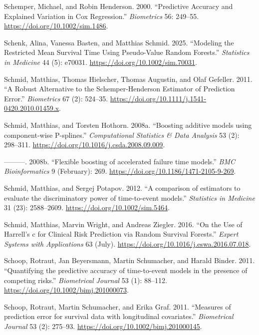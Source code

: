 \documentclass[
  letterpaper,
  krantz2]{style/krantz}
\newlength{\cslhangindent}
\newenvironment{CSLReferences}[2] %
 {\begin{list}{}{%
  \setlength{\itemindent}{0pt}
  \setlength{\leftmargin}{0pt}
  \setlength{\parsep}{0pt}
  \ifodd #1
   \setlength{\leftmargin}{\cslhangindent}
   \setlength{\itemindent}{-1\cslhangindent}
  \fi
  \setlength{\itemsep}{#2\baselineskip}}}
 {\end{list}}
\begin{document}
\begin{CSLReferences}{1}{0}
Schemper, Michael, and Robin Henderson. 2000. {``{Predictive Accuracy
and Explained Variation in Cox Regression}.''} \emph{Biometrics} 56:
249--55. \url{https://doi.org/10.1002/sim.1486}.

Schenk, Alina, Vanessa Basten, and Matthias Schmid. 2025. {``Modeling
the {Restricted Mean Survival Time Using Pseudo-Value Random
Forests}.''} \emph{Statistics in Medicine} 44 (5): e70031.
\url{https://doi.org/10.1002/sim.70031}.

Schmid, Matthias, Thomas Hielscher, Thomas Augustin, and Olaf Gefeller.
2011. {``{A Robust Alternative to the Schemper-Henderson Estimator of
Prediction Error}.''} \emph{Biometrics} 67 (2): 524--35.
\url{https://doi.org/10.1111/j.1541-0420.2010.01459.x}.

Schmid, Matthias, and Torsten Hothorn. 2008a. {``{Boosting additive
models using component-wise P-splines}.''} \emph{Computational
Statistics \& Data Analysis} 53 (2): 298--311.
\url{https://doi.org/10.1016/j.csda.2008.09.009}.

---------. 2008b. {``{Flexible boosting of accelerated failure time
models}.''} \emph{BMC Bioinformatics} 9 (February): 269.
\url{https://doi.org/10.1186/1471-2105-9-269}.

Schmid, Matthias, and Sergej Potapov. 2012. {``{A comparison of
estimators to evaluate the discriminatory power of time-to-event
models}.''} \emph{Statistics in Medicine} 31 (23): 2588--2609.
\url{https://doi.org/10.1002/sim.5464}.

Schmid, Matthias, Marvin Wright, and Andreas Ziegler. 2016. {``On the
Use of Harrell's c for Clinical Risk Prediction via Random Survival
Forests.''} \emph{Expert Systems with Applications} 63 (July).
\url{https://doi.org/10.1016/j.eswa.2016.07.018}.

Schoop, Rotraut, Jan Beyersmann, Martin Schumacher, and Harald Binder.
2011. {``{Quantifying the predictive accuracy of time-to-event models in
the presence of competing risks}.''} \emph{Biometrical Journal} 53 (1):
88--112. \url{https://doi.org/10.1002/bimj.201000073}.

Schoop, Rotraut, Martin Schumacher, and Erika Graf. 2011. {``{Measures
of prediction error for survival data with longitudinal covariates}.''}
\emph{Biometrical Journal} 53 (2): 275--93.
\url{https://doi.org/10.1002/bimj.201000145}.


\end{CSLReferences}
\end{document}
